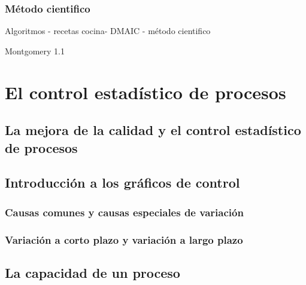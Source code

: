 \documentclass[
  letterpaper,
  DIV=11,
  numbers=noendperiod,
  oneside]{scrreprt}
\begin{document}
\hypertarget{muxe9todo-cientifico}{%
\subsection{Método cientifico}\label{muxe9todo-cientifico}}

Algoritmos - recetas cocina- DMAIC - método cientifico

Montgomery 1.1


\hypertarget{el-control-estaduxedstico-de-procesos}{%
\chapter{El control estadístico de
procesos}\label{el-control-estaduxedstico-de-procesos}}

\hypertarget{la-mejora-de-la-calidad-y-el-control-estaduxedstico-de-procesos}{%
\section{La mejora de la calidad y el control estadístico de
procesos}\label{la-mejora-de-la-calidad-y-el-control-estaduxedstico-de-procesos}}

\hypertarget{introducciuxf3n-a-los-gruxe1ficos-de-control}{%
\section{Introducción a los gráficos de
control}\label{introducciuxf3n-a-los-gruxe1ficos-de-control}}

\hypertarget{causas-comunes-y-causas-especiales-de-variaciuxf3n}{%
\subsection{Causas comunes y causas especiales de
variación}\label{causas-comunes-y-causas-especiales-de-variaciuxf3n}}

\hypertarget{variaciuxf3n-a-corto-plazo-y-variaciuxf3n-a-largo-plazo}{%
\subsection{Variación a corto plazo y variación a largo
plazo}\label{variaciuxf3n-a-corto-plazo-y-variaciuxf3n-a-largo-plazo}}

\hypertarget{la-capacidad-de-un-proceso}{%
\section{La capacidad de un proceso}\label{la-capacidad-de-un-proceso}}
\end{document}
